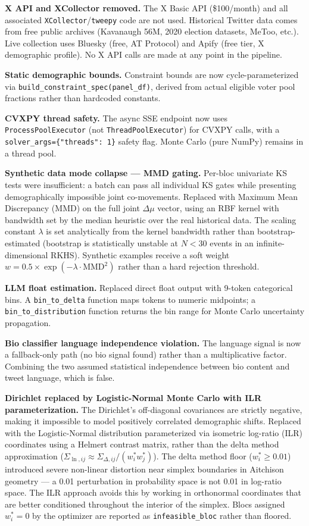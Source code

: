 \documentclass[11pt]{article}
\begin{document}
\textbf{X API and XCollector removed.} The X Basic API (\$100/month) and all
associated \texttt{XCollector}/\texttt{tweepy} code are not used. Historical
Twitter data comes from free public archives (Kavanaugh 56M, 2020 election
datasets, MeToo, etc.). Live collection uses Bluesky (free, AT Protocol) and
Apify (free tier, X demographic profile). No X API calls are made at any point
in the pipeline.

\textbf{Static demographic bounds.} Constraint bounds are now cycle-parameterized
via \texttt{build\_constraint\_spec(panel\_df)}, derived from actual eligible voter
pool fractions rather than hardcoded constants.

\textbf{CVXPY thread safety.} The async SSE endpoint now uses \texttt{ProcessPoolExecutor}
(not \texttt{ThreadPoolExecutor}) for CVXPY calls, with a \texttt{solver\_args=\{"threads": 1\}}
safety flag. Monte Carlo (pure NumPy) remains in a thread pool.

\textbf{Synthetic data mode collapse --- MMD gating.} Per-bloc univariate KS tests
were insufficient: a batch can pass all individual KS gates while presenting
demographically impossible joint co-movements. Replaced with Maximum Mean
Discrepancy (MMD) on the full joint $\Delta\mu$ vector, using an RBF kernel with
bandwidth set by the median heuristic over the real historical data. The scaling
constant $\lambda$ is set analytically from the kernel bandwidth rather than
bootstrap-estimated (bootstrap is statistically unstable at $N < 30$ events in
an infinite-dimensional RKHS). Synthetic examples receive a soft weight
$w = 0.5 \times \exp(-\lambda \cdot \text{MMD}^2)$ rather than a hard rejection
threshold.

\textbf{LLM float estimation.} Replaced direct float output with 9-token categorical
bins. A \texttt{bin\_to\_delta} function maps tokens to numeric midpoints; a
\texttt{bin\_to\_distribution} function returns the bin range for Monte Carlo
uncertainty propagation.

\textbf{Bio classifier language independence violation.} The language signal is now
a fallback-only path (no bio signal found) rather than a multiplicative factor.
Combining the two assumed statistical independence between bio content and tweet
language, which is false.

\textbf{Dirichlet replaced by Logistic-Normal Monte Carlo with ILR parameterization.}
The Dirichlet's off-diagonal covariances are strictly negative, making it impossible
to model positively correlated demographic shifts. Replaced with the Logistic-Normal
distribution parameterized via isometric log-ratio (ILR) coordinates using a Helmert
contrast matrix, rather than the delta method approximation
($\Sigma_{\ln,ij} \approx \Sigma_{\Delta,ij}/(w_i^* w_j^*)$). The delta method
floor ($w_i^* \geq 0.01$) introduced severe non-linear distortion near simplex
boundaries in Aitchison geometry --- a 0.01 perturbation in probability space is
not 0.01 in log-ratio space. The ILR approach avoids this by working in orthonormal
coordinates that are better conditioned throughout the interior of the simplex.
Blocs assigned $w_i^* = 0$ by the optimizer are reported as \texttt{infeasible\_bloc}
rather than floored.
\end{document}
